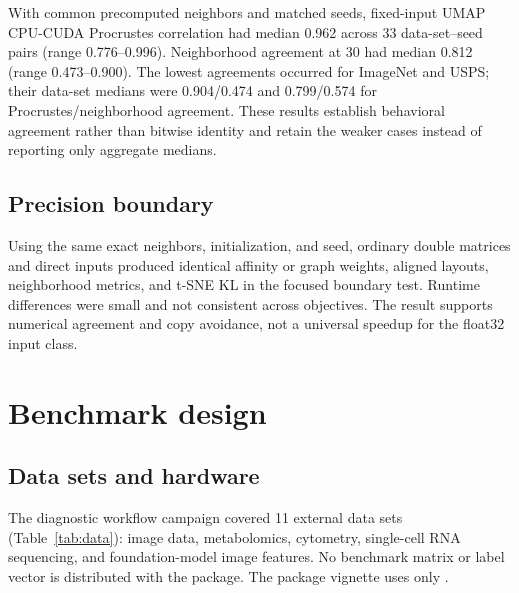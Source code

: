 \documentclass[article]{jss}
\begin{document}
With common precomputed neighbors and matched seeds, fixed-input UMAP
CPU-CUDA Procrustes correlation had median 0.962 across 33 data-set--seed
pairs (range 0.776--0.996). Neighborhood agreement at 30 had median 0.812
(range 0.473--0.900). The lowest agreements occurred for ImageNet and USPS;
their data-set medians were 0.904/0.474 and 0.799/0.574 for
Procrustes/neighborhood agreement. These results establish behavioral
agreement rather than bitwise identity and retain the weaker cases instead of
reporting only aggregate medians.

\subsection{Precision boundary}

Using the same exact neighbors, initialization, and seed, ordinary double
matrices and direct  inputs produced identical affinity or graph
weights, aligned layouts, neighborhood metrics, and t-SNE KL in the focused
boundary test. Runtime differences were small and not consistent across
objectives. The result supports numerical agreement and copy avoidance, not a
universal speedup for the float32 input class.

\section{Benchmark design}
\label{sec:benchmark}

\subsection{Data sets and hardware}

The diagnostic workflow campaign covered 11 external data sets
(Table~\ref{tab:data}):
image data, metabolomics, cytometry, single-cell RNA sequencing, and
foundation-model image features. No benchmark matrix or label vector is
distributed with the package. The package vignette uses only
.
\end{document}
